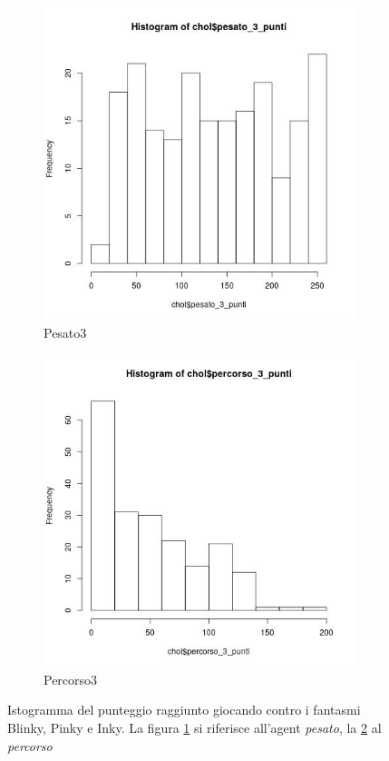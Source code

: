 \documentclass[8pt]{book}
\begin{document}
\begin{figure}
  \centering
  \begin{subfigure}[b]{0.49\textwidth}
    \includegraphics[width=\textwidth]{img/pesato_3_punteggio.png}
    \caption{Pesato3}
    \label{Pesato3}
   \end{subfigure}
  \begin{subfigure}[b]{0.49\textwidth}
    \includegraphics[width=\textwidth]{img/percorso_3_punteggio.png}
    \caption{Percorso3}
    \label{Percorso3}
  \end{subfigure}
  \caption{Istogramma del punteggio raggiunto giocando contro  i fantasmi Blinky, Pinky e Inky. La figura \ref{Pesato3} si riferisce all'agent \emph{pesato}, la \ref{Percorso3} al \emph{percorso}}
  \label{pesatoPercorso3}
\end{figure}
\end{document}
